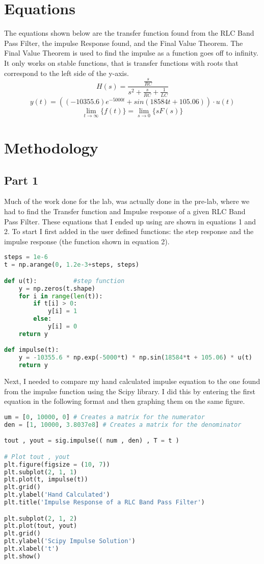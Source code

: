 \documentclass[12pt]{report}
\begin{document}
\section{Equations}
The equations shown below are the transfer function found from the RLC
Band Pass Filter, the impulse Response found, and the Final Value Theorem.
The Final Value Theorem is used to find the impulse as a function goes off
to infinity. It only works on stable functions, that is transfer functions
with roots that correspond to the left side of the y-axis.
\begin{equation}
    H(s) = \frac{\frac{s}{RC}}{s^{2} + \frac{s}{RC} + \frac{1}{LC}}
\end{equation}
\begin{equation}
    y(t) = ((-10355.6)e^{-5000t} + sin(18584t + 105.06)) \cdot u(t)
\end{equation}
\begin{equation}
    \lim_{t\to \infty}\{f(t)\} = \lim_{s\to 0}\{sF(s)\}
\end{equation}

\section{Methodology}
\subsection{Part 1}
Much of the work done for the lab, was actually done in the pre-lab, where
we had to find the Transfer function and Impulse response of a given RLC
Band Pass Filter. These equations that I ended up using are shown in 
equations 1 and 2. To start I first added in the user defined functions: 
the step response and the impulse response (the function shown in equation
2). 

\begin{lstlisting}[language=Python]
steps = 1e-6
t = np.arange(0, 1.2e-3+steps, steps) 

def u(t):          #step function
    y = np.zeros(t.shape)
    for i in range(len(t)):
        if t[i] > 0:
            y[i] = 1
        else:
            y[i] = 0
    return y

def impulse(t):
    y = -10355.6 * np.exp(-5000*t) * np.sin(18584*t + 105.06) * u(t)
    return y
\end{lstlisting}
Next, I needed to compare my hand calculated impulse equation to the 
one found from the impulse function using the Scipy library. I did this by
entering the first equation in the following format and then graphing them
on the same figure.
\begin{lstlisting}[language=Python]
um = [0, 10000, 0] # Creates a matrix for the numerator
den = [1, 10000, 3.8037e8] # Creates a matrix for the denominator

tout , yout = sig.impulse(( num , den) , T = t )

# Plot tout , yout
plt.figure(figsize = (10, 7))
plt.subplot(2, 1, 1)
plt.plot(t, impulse(t))
plt.grid()
plt.ylabel('Hand Calculated')
plt.title('Impulse Response of a RLC Band Pass Filter')

plt.subplot(2, 1, 2)
plt.plot(tout, yout)
plt.grid()
plt.ylabel('Scipy Impulse Solution') 
plt.xlabel('t')
plt.show()
\end{lstlisting}
\end{document}
